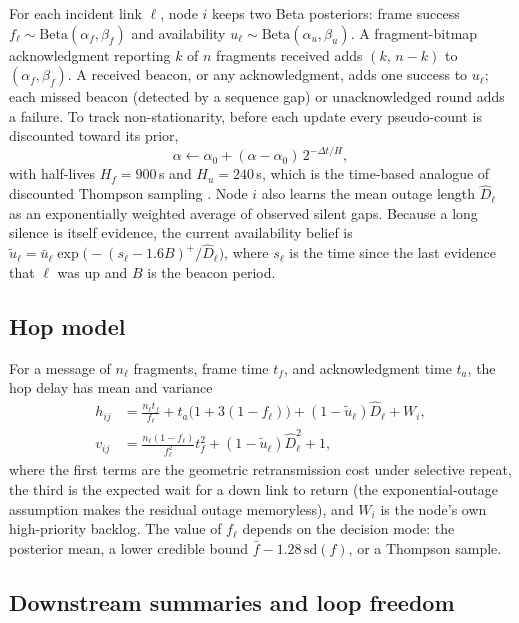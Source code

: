 \documentclass[jou,a4paper,11pt,floatsintext]{apa7}
\begin{document}
For each incident link $\ell$, node $i$ keeps two Beta posteriors: frame success $f_\ell\sim\mathrm{Beta}(\alpha_f,\beta_f)$ and availability $u_\ell\sim\mathrm{Beta}(\alpha_u,\beta_u)$. A fragment-bitmap acknowledgment reporting $k$ of $n$ fragments received adds $(k,\,n-k)$ to $(\alpha_f,\beta_f)$. A received beacon, or any acknowledgment, adds one success to $u_\ell$; each missed beacon (detected by a sequence gap) or unacknowledged round adds a failure. To track non-stationarity, before each update every pseudo-count is discounted toward its prior,
\begin{equation}
\alpha \leftarrow \alpha_0 + (\alpha-\alpha_0)\,2^{-\Delta t/H},
\label{eq:decay}
\end{equation}
with half-lives $H_f=900$\,s and $H_u=240$\,s, which is the time-based analogue of discounted Thompson sampling \parencite{raj2017}. Node $i$ also learns the mean outage length $\hat D_\ell$ as an exponentially weighted average of observed silent gaps. Because a long silence is itself evidence, the current availability belief is $\tilde u_\ell = \bar u_\ell\exp\!\big(-(s_\ell-1.6B)^+/\hat D_\ell\big)$, where $s_\ell$ is the time since the last evidence that $\ell$ was up and $B$ is the beacon period.

\subsection{Hop model}

For a message of $n_\ell$ fragments, frame time $t_f$, and acknowledgment time $t_a$, the hop delay has mean and variance
\begin{equation}
\begin{aligned}
h_{ij} &= \frac{n_\ell t_f}{f_\ell} + t_a\big(1+3(1-f_\ell)\big) + (1-\tilde u_\ell)\hat D_\ell + W_i,\\
v_{ij} &= \frac{n_\ell(1-f_\ell)}{f_\ell^2}t_f^2 + (1-\tilde u_\ell)\hat D_\ell^2 + 1,
\end{aligned}
\label{eq:hop}
\end{equation}
where the first terms are the geometric retransmission cost under selective repeat, the third is the expected wait for a down link to return (the exponential-outage assumption makes the residual outage memoryless), and $W_i$ is the node's own high-priority backlog. The value of $f_\ell$ depends on the decision mode: the posterior mean, a lower credible bound $\bar f-1.28\,\mathrm{sd}(f)$, or a Thompson sample.

\subsection{Downstream summaries and loop freedom}
\end{document}
